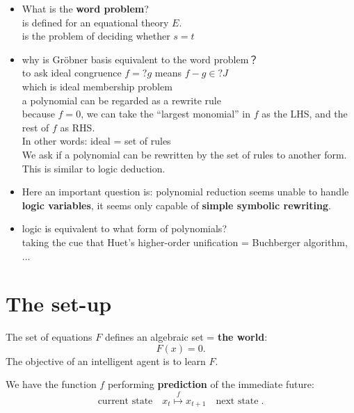 \begin{itemize}
	\item What is the \textbf{word problem}? \\
	is defined for an equational theory $E$. \\
	is the problem of deciding whether $s = t$

	\item why is Gr\"{o}bner basis equivalent to the word problem？ \\
	to ask ideal congruence $f =? g$ means $f - g \in? J$ \\
	which is ideal membership problem \\
	a polynomial can be regarded as a rewrite rule \\
	because $f = 0$, we can take the ``largest monomial'' in $f$ as the LHS, and the rest of $f$ as RHS. \\
	In other words:  ideal = set of rules \\
	We ask if a polynomial can be rewritten by the set of rules to another form.  \\
	This is similar to logic deduction.
	
	\item Here an important question is: polynomial reduction seems unable to handle \textbf{logic variables}, it seems only capable of \textbf{simple symbolic rewriting}.
	
	\item logic is equivalent to what form of polynomials? \\
	taking the cue that Huet's higher-order unification = Buchberger algorithm, ...
\end{itemize}

\section{The set-up}

The set of equations $F$ defines an algebraic set = \textbf{the world}:
\begin{equation}
F(x) = 0 .
\end{equation}
The objective of an intelligent agent is to learn $F$.

We have the function $f$ performing \textbf{prediction} of the immediate future:
\begin{equation}
\boxed{\mbox{current state}} \quad x_t \stackrel{f}{\mapsto} x_{t+1} \quad \boxed{\mbox{next state}} \;.
\end{equation}

